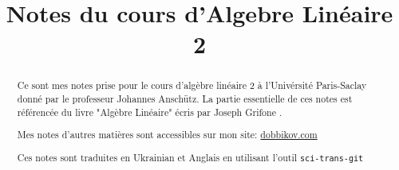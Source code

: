 \documentclass[a4paper]{report}
\title{Notes du cours d'Algebre Linéaire 2}
\begin{document}
\maketitle
\begin{abstract}
    Ce sont mes notes prise pour le cours d'algèbre linéaire 2 à l'Univérsité Paris-Saclay donné par le professeur Johannes Anschütz. 
    La partie essentielle de ces notes est référencée du livre "Algèbre Linéaire" écris par Joseph Grifone \cite{grifone}.

   Mes notes d'autres matières sont accessibles sur mon site: \href{https://dobbikov.com/lecture_notes}{dobbikov.com}

  Ces notes sont traduites en Ukrainian et Anglais en utilisant l'outil \texttt{sci-trans-git} \cite{korotenko-sci-trans-git}
\end{abstract}
\tableofcontents











\nocite{*}
\printbibliography
\end{document}
